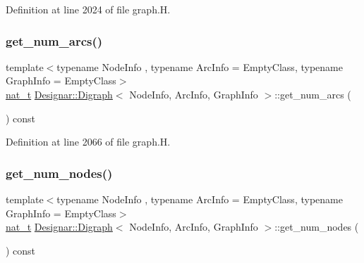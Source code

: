 Definition at line 2024 of file graph.\+H.

\mbox{\label{class_designar_1_1_digraph_aa6289acc079b48c3ebaead44a974d716}} 
\subsubsection{\texorpdfstring{get\+\_\+num\+\_\+arcs()}{get\_num\_arcs()}}
{\footnotesize\ttfamily template$<$typename Node\+Info , typename Arc\+Info  = Empty\+Class, typename Graph\+Info  = Empty\+Class$>$ \\
\hyperlink{namespace_designar_aa72662848b9f4815e7bf31a7cf3e33d1}{nat\+\_\+t} \hyperlink{class_designar_1_1_digraph}{Designar\+::\+Digraph}$<$ Node\+Info, Arc\+Info, Graph\+Info $>$\+::get\+\_\+num\+\_\+arcs (\begin{DoxyParamCaption}{ }\end{DoxyParamCaption}) const\hspace{0.3cm}{\ttfamily [inline]}}



Definition at line 2066 of file graph.\+H.

\mbox{\label{class_designar_1_1_digraph_a7e2f0b56ec85cfd63ff757bef58ae702}} 
\subsubsection{\texorpdfstring{get\+\_\+num\+\_\+nodes()}{get\_num\_nodes()}}
{\footnotesize\ttfamily template$<$typename Node\+Info , typename Arc\+Info  = Empty\+Class, typename Graph\+Info  = Empty\+Class$>$ \\
\hyperlink{namespace_designar_aa72662848b9f4815e7bf31a7cf3e33d1}{nat\+\_\+t} \hyperlink{class_designar_1_1_digraph}{Designar\+::\+Digraph}$<$ Node\+Info, Arc\+Info, Graph\+Info $>$\+::get\+\_\+num\+\_\+nodes (\begin{DoxyParamCaption}{ }\end{DoxyParamCaption}) const\hspace{0.3cm}{\ttfamily [inline]}}




